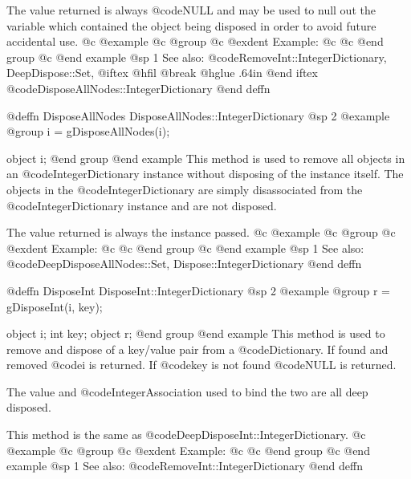 The value returned is always @code{NULL} and may be used to null out
the variable which contained the object being disposed in order to
avoid future accidental use.
@c @example
@c @group
@c @exdent Example:
@c 
@c @end group
@c @end example
@sp 1
See also:  @code{RemoveInt::IntegerDictionary, DeepDispose::Set,}
@iftex
@hfil @break @hglue .64in      
@end iftex
@code{DisposeAllNodes::IntegerDictionary}
@end deffn













@deffn {DisposeAllNodes} DisposeAllNodes::IntegerDictionary
@sp 2
@example
@group
i = gDisposeAllNodes(i);

object  i;
@end group
@end example
This method is used to remove all objects in an @code{IntegerDictionary}
instance without disposing of the instance itself.  The objects in the
@code{IntegerDictionary} are simply disassociated from the
@code{IntegerDictionary} instance and are not disposed.

The value returned is always the instance passed.
@c @example
@c @group
@c @exdent Example:
@c 
@c @end group
@c @end example
@sp 1
See also:  @code{DeepDisposeAllNodes::Set, Dispose::IntegerDictionary}
@end deffn




















@deffn {DisposeInt} DisposeInt::IntegerDictionary
@sp 2
@example
@group
r = gDisposeInt(i, key);

object  i;
int     key;
object  r;
@end group
@end example
This method is used to remove and dispose of a key/value pair from a
@code{Dictionary}.  If found and removed @code{i} is returned.  If @code{key}
is not found @code{NULL} is returned.

The value and @code{IntegerAssociation} used to bind the two are all deep
disposed.

This method is the same as @code{DeepDisposeInt::IntegerDictionary}.
@c @example
@c @group
@c @exdent Example:
@c 
@c @end group
@c @end example
@sp 1
See also:  @code{RemoveInt::IntegerDictionary}
@end deffn













